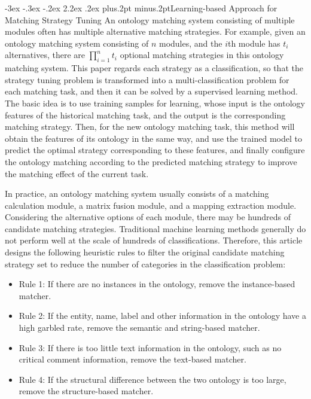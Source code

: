 \documentclass[twoside]{article}
\makeatletter
\def\section{\@startsection{section}{1}{\z@}%
 {-3ex \@plus -.3ex \@minus -.2ex}%
 {2.2ex \@plus.2ex}%
{\normalfont\normalsize\protect\baselineskip=14.5pt plus.2pt minus.2pt\bfseries}}
\def\subsection{\@startsection{subsection}{2}{\z@}%
 {-3ex\@plus -.2ex \@minus -.2ex}%
 {2ex \@plus.2ex}%
{\normalfont\normalsize\protect\baselineskip=12.5pt plus.2pt minus.2pt\bfseries}}
\makeatother
\begin{document}
\section{Learning-based Approach for Matching Strategy Tuning}
An ontology matching system consisting of multiple modules often has multiple alternative matching strategies.
For example, given an ontology matching system consisting of $ n $ modules, and the $ i $th module has $ t_i $ alternatives, there are $\prod_{i=1}^{n}t_i $ optional matching strategies in this ontology matching system.
This paper regards each strategy as a classification, so that the strategy tuning problem is transformed into a multi-classification problem for each matching task, and then it can be solved by a supervised learning method.
The basic idea is to use training samples for learning, whose input is the ontology features of the historical matching task, and the output is the corresponding matching strategy.
Then, for the new ontology matching task, this method will obtain the features of its ontology in the same way, and use the trained model to predict the optimal strategy corresponding to these features, and finally configure the ontology matching according to the predicted matching strategy to improve the matching effect of the current task.

In practice, an ontology matching system usually consists of a matching calculation module, a matrix fusion module, and a mapping extraction module.
Considering the alternative options of each module, there may be hundreds of candidate matching strategies.
Traditional machine learning methods generally do not perform well at the scale of hundreds of classifications.
Therefore, this article designs the following heuristic rules to filter the original candidate matching strategy set to reduce the number of categories in the classification problem:
\begin{itemize}
\item Rule 1: If there are no instances in the ontology, remove the instance-based matcher.
\item Rule 2: If the entity, name, label and other information in the ontology have a high garbled rate, remove the semantic and string-based matcher.
\item Rule 3: If there is too little text information in the ontology, such as no critical comment information, remove the text-based matcher.
\item Rule 4: If the structural difference between the two ontology is too large, remove the structure-based matcher.
\end{itemize}
\end{document}
